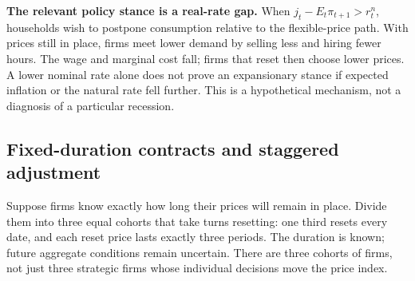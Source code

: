 \begin{greenblock}
\textbf{The relevant policy stance is a real-rate gap.}
When $j_t-E_t\pi_{t+1}>r_t^n$, households wish to postpone consumption relative
to the flexible-price path. With prices still in place, firms meet lower demand
by selling less and hiring fewer hours. The wage and marginal cost fall; firms
that reset then choose lower prices. A lower nominal rate alone does not prove
an expansionary stance if expected inflation or the natural rate fell further.
This is a hypothetical mechanism, not a diagnosis of a particular recession.
\end{greenblock}

\subsection{Fixed-duration contracts and staggered adjustment}

Suppose firms know exactly how long their prices will remain in place. Divide
them into three equal cohorts that take turns resetting: one third resets every
date, and each reset price lasts exactly three periods. The duration is known; future aggregate
conditions remain uncertain. There are three cohorts of firms, not just three
strategic firms whose individual decisions move the price index.

